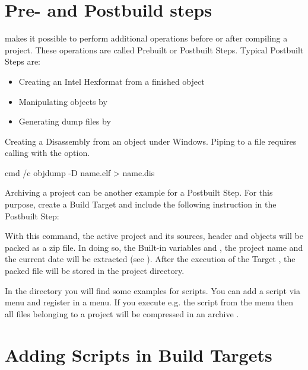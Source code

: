 \section{Pre- and Postbuild steps}\label{sec:pre_postbuild}

\codeblocks makes it possible to perform additional operations before or after compiling a project. These operations are called Prebuilt or Postbuilt Steps. Typical Postbuilt Steps are:

\begin{itemize}
\item Creating an Intel Hexformat from a finished object
\item Manipulating objects by 
\item Generating dump files by 
\end{itemize}


Creating a Disassembly from an object under Windows. Piping to a file requires calling  with the  option.

\begin{cmd}
cmd /c objdump -D name.elf > name.dis
\end{cmd}

Archiving a project can be another example for a Postbuilt Step. For this purpose, create a Build Target  and include the following instruction in the Postbuilt Step:


With this command, the active project and its sources, header and objects will be packed as a zip file. In doing so, the Built-in variables  and , the project name and the current date will be extracted (see ). After the execution of the Target , the packed file will be stored in the project directory.

In the  directory you will find some examples for scripts. You can add a script via menu  and register in a menu. If you execute e.g. the script  from the menu then all files belonging to a project will be compressed in an archive .

\section{Adding Scripts in Build Targets}

